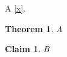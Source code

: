\documentclass{article}
\newcounter{c_n}
\newtheorem{thm}{Theorem}
\newcounter{claim_nb}[thm]
\newtheorem{claim}[claim_nb]{Claim}
\begin{document}
\label{x} A \ref{x}.
\begin{thm}A\end{thm}
\begin{claim}\label{c}B\end{claim}
\end{document}

